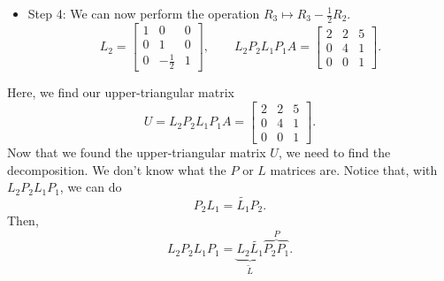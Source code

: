 \documentclass[letterpaper]{article}
\newcommand{\0}{\mathbf{0}}
\begin{document}
\begin{mdframed}
\begin{itemize}
        \item Step 4: We can now perform the operation $R_3 \mapsto R_3 - \frac{1}{2}R_2$. 
        \[L_2 = \begin{bmatrix}
            1 & 0 & 0 \\ 
            0 & 1 & 0 \\ 
            0 & -\frac{1}{2} & 1
        \end{bmatrix}, \qquad L_2 P_2 L_1 P_1 A = \begin{bmatrix}
            2 & 2 & 5 \\ 
            0 & 4 & 1 \\ 
            0 & 0 & 1
        \end{bmatrix}.\]
    \end{itemize}
    Here, we find our upper-triangular matrix \[U = L_2 P_2 L_1 P_1 A = \begin{bmatrix}
        2 & 2 & 5 \\ 
        0 & 4 & 1 \\ 
        0 & 0 & 1
    \end{bmatrix}.\] Now that we found the upper-triangular matrix $U$, we need to find the decomposition. We don't know what the $P$ or $L$ matrices are. Notice that, with $L_2 P_2 L_1 P_1$, we can do 
    \[P_2 L_1 = \tilde{L_1} P_2.\] Then, 
    \[L_2 P_2 L_1 P_1 = \underbrace{L_2 \tilde{L_1}}_{\tilde{L}} \overbrace{P_2 P_1}^{P}.\]


\end{mdframed}
\end{document}

